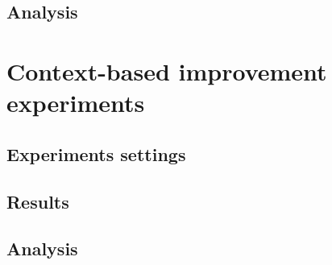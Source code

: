 \subsection{Analysis}


\section{Context-based improvement experiments}
\subsection{Experiments settings}
\subsection{Results}
\subsection{Analysis}